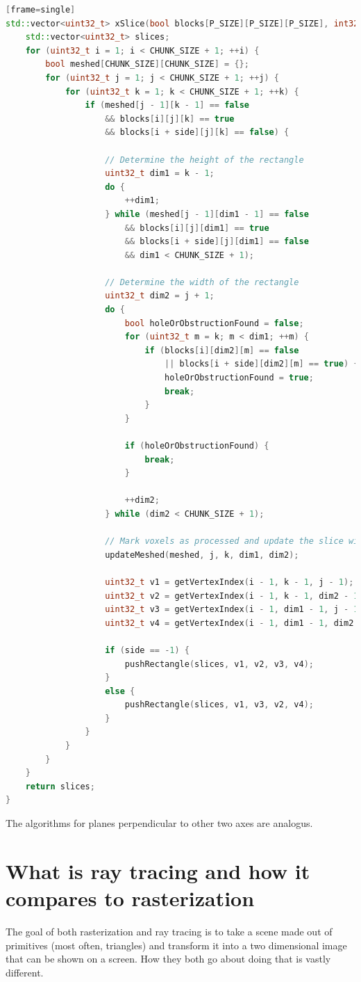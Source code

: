 \documentclass[times, utf8, zavrsni, numeric]{fer}
\begin{document}
\begin{lstlisting}[language=c++][frame=single]
std::vector<uint32_t> xSlice(bool blocks[P_SIZE][P_SIZE][P_SIZE], int32_t side) {
	std::vector<uint32_t> slices;
	for (uint32_t i = 1; i < CHUNK_SIZE + 1; ++i) {
		bool meshed[CHUNK_SIZE][CHUNK_SIZE] = {};
		for (uint32_t j = 1; j < CHUNK_SIZE + 1; ++j) {
			for (uint32_t k = 1; k < CHUNK_SIZE + 1; ++k) {
				if (meshed[j - 1][k - 1] == false
					&& blocks[i][j][k] == true
					&& blocks[i + side][j][k] == false) {

					// Determine the height of the rectangle
					uint32_t dim1 = k - 1;
					do {
						++dim1;
					} while (meshed[j - 1][dim1 - 1] == false
						&& blocks[i][j][dim1] == true
						&& blocks[i + side][j][dim1] == false
						&& dim1 < CHUNK_SIZE + 1);

					// Determine the width of the rectangle
					uint32_t dim2 = j + 1;
					do {
						bool holeOrObstructionFound = false;
						for (uint32_t m = k; m < dim1; ++m) {
							if (blocks[i][dim2][m] == false
								|| blocks[i + side][dim2][m] == true) {
								holeOrObstructionFound = true;
								break;
							}
						}

						if (holeOrObstructionFound) {
							break;
						}

						++dim2;
					} while (dim2 < CHUNK_SIZE + 1);

					// Mark voxels as processed and update the slice with the quad
					updateMeshed(meshed, j, k, dim1, dim2);

					uint32_t v1 = getVertexIndex(i - 1, k - 1, j - 1);
					uint32_t v2 = getVertexIndex(i - 1, k - 1, dim2 - 1);
					uint32_t v3 = getVertexIndex(i - 1, dim1 - 1, j - 1);
					uint32_t v4 = getVertexIndex(i - 1, dim1 - 1, dim2 - 1);

					if (side == -1) {
						pushRectangle(slices, v1, v2, v3, v4);
					}
					else {
						pushRectangle(slices, v1, v3, v2, v4);
					}
				}
			}
		}
	}
	return slices;
}
\end{lstlisting}

The algorithms for planes perpendicular to other two axes are analogus.

\chapter{What is ray tracing and how it compares to rasterization}
The goal of both rasterization and ray tracing is to take a scene made out of primitives (most often, triangles) and transform it into a two dimensional image that can be shown on a screen. How they both go about doing that is vastly different.
\end{document}
